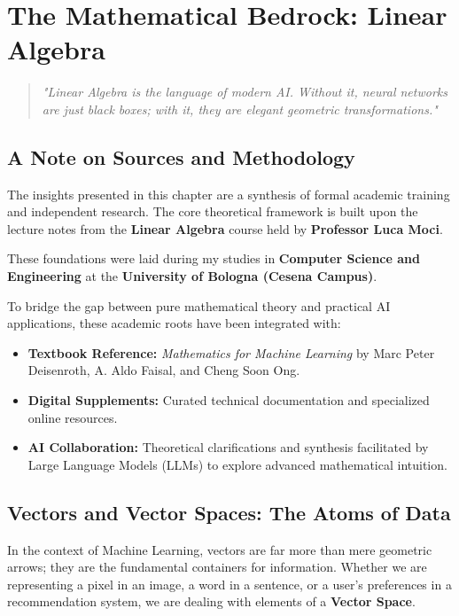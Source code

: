 \chapter{The Mathematical Bedrock: Linear Algebra}

\begin{quote}
    \textit{"Linear Algebra is the language of modern AI. Without it, neural networks are just black boxes; with it, they are elegant geometric transformations."}
\end{quote}

\section*{A Note on Sources and Methodology}
The insights presented in this chapter are a synthesis of formal academic training and independent research. The core theoretical framework is built upon the lecture notes from the \textbf{Linear Algebra} course held by \textbf{Professor Luca Moci}.

These foundations were laid during my studies in \textbf{Computer Science and Engineering} at the \textbf{University of Bologna (Cesena Campus)}.

To bridge the gap between pure mathematical theory and practical AI applications, these academic roots have been integrated with:
\begin{itemize}
    \item \textbf{Textbook Reference:} \textit{Mathematics for Machine Learning} by Marc Peter Deisenroth, A. Aldo Faisal, and Cheng Soon Ong.
    \item \textbf{Digital Supplements:} Curated technical documentation and specialized online resources.
    \item \textbf{AI Collaboration:} Theoretical clarifications and synthesis facilitated by Large Language Models (LLMs) to explore advanced mathematical intuition.
\end{itemize}

\section{Vectors and Vector Spaces: The Atoms of Data}

In the context of Machine Learning, vectors are far more than mere geometric arrows; they are the fundamental containers for information. Whether we are representing a pixel in an image, a word in a sentence, or a user's preferences in a recommendation system, we are dealing with elements of a \textbf{Vector Space}.

